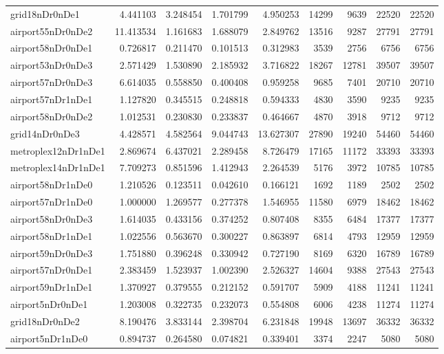 \begin{longtable}{|l|r|r|r|r|r|r|r|r|}
grid18nDr0nDe1 & 4.441103 & 3.248454 & 1.701799 & 4.950253 & 14299 & 9639 & 22520 & 22520 \\
airport55nDr0nDe2 & 11.413534 & 1.161683 & 1.688079 & 2.849762 & 13516 & 9287 & 27791 & 27791 \\
airport58nDr0nDe1 & 0.726817 & 0.211470 & 0.101513 & 0.312983 & 3539 & 2756 & 6756 & 6756 \\
airport53nDr0nDe3 & 2.571429 & 1.530890 & 2.185932 & 3.716822 & 18267 & 12781 & 39507 & 39507 \\
airport57nDr0nDe3 & 6.614035 & 0.558850 & 0.400408 & 0.959258 & 9685 & 7401 & 20710 & 20710 \\
airport57nDr1nDe1 & 1.127820 & 0.345515 & 0.248818 & 0.594333 & 4830 & 3590 & 9235 & 9235 \\
airport58nDr0nDe2 & 1.012531 & 0.230830 & 0.233837 & 0.464667 & 4870 & 3918 & 9712 & 9712 \\
grid14nDr0nDe3 & 4.428571 & 4.582564 & 9.044743 & 13.627307 & 27890 & 19240 & 54460 & 54460 \\
metroplex12nDr1nDe1 & 2.869674 & 6.437021 & 2.289458 & 8.726479 & 17165 & 11172 & 33393 & 33393 \\
metroplex14nDr1nDe1 & 7.709273 & 0.851596 & 1.412943 & 2.264539 & 5176 & 3972 & 10785 & 10785 \\
airport58nDr1nDe0 & 1.210526 & 0.123511 & 0.042610 & 0.166121 & 1692 & 1189 & 2502 & 2502 \\
airport57nDr1nDe0 & 1.000000 & 1.269577 & 0.277378 & 1.546955 & 11580 & 6979 & 18462 & 18462 \\
airport58nDr0nDe3 & 1.614035 & 0.433156 & 0.374252 & 0.807408 & 8355 & 6484 & 17377 & 17377 \\
airport58nDr1nDe1 & 1.022556 & 0.563670 & 0.300227 & 0.863897 & 6814 & 4793 & 12959 & 12959 \\
airport59nDr0nDe3 & 1.751880 & 0.396248 & 0.330942 & 0.727190 & 8169 & 6320 & 16789 & 16789 \\
airport57nDr0nDe1 & 2.383459 & 1.523937 & 1.002390 & 2.526327 & 14604 & 9388 & 27543 & 27543 \\
airport59nDr1nDe1 & 1.370927 & 0.379555 & 0.212152 & 0.591707 & 5909 & 4188 & 11241 & 11241 \\
airport5nDr0nDe1 & 1.203008 & 0.322735 & 0.232073 & 0.554808 & 6006 & 4238 & 11274 & 11274 \\
grid18nDr0nDe2 & 8.190476 & 3.833144 & 2.398704 & 6.231848 & 19948 & 13697 & 36332 & 36332 \\
airport5nDr1nDe0 & 0.894737 & 0.264580 & 0.074821 & 0.339401 & 3374 & 2247 & 5080 & 5080 \\

\end{longtable}
